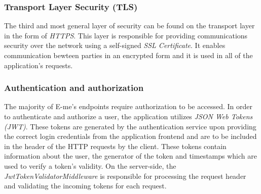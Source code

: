 \subsubsection{Transport Layer Security (TLS)}

The third and most general layer of security can be found on the transport layer in the form of \emph{HTTPS}.
This layer is responsible for providing communications security over the network using a self-signed \emph{SSL Certificate}.
It enables communication bewteen parties in an encrypted form and it is used in all of the application's requests.

\subsubsection{Authentication and authorization}

The majority of E-me's endpoints require authorization to be accessed.
In order to authenticate and authorize a user, the application utilizes \emph{JSON Web Tokens (JWT)}.
These tokens are generated by the authentication service upon providing the correct login credentials from the application frontend and are to be
included in the header of the HTTP requests by the client.
These tokens contain information about the user, the generator of the token and timestamps which are used to verify a token's validity.
On the server-side, the \emph{JwtTokenValidatorMiddleware} is responsible for processing the request header and validating the incoming tokens for each request.